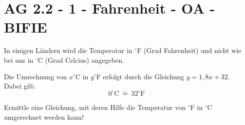 \section{AG 2.2 - 1 - Fahrenheit - OA - BIFIE}

\begin{beispiel}[AG 2.2]{1} %
		In einigen Ländern wird die Temperatur in $^\circ$F (Grad Fahrenheit) und nicht wie bei uns in $^\circ$C (Grad Celcius) angegeben. 

Die Umrechnung von $x^\circ$C in $y^\circ$F erfolgt durch die Gleichung $y=1,8x+32$. Dabei gilt:
\[0^\circ\text{C} ~\widehat{=}~	 32^\circ\text{F}\]

Ermittle eine Gleichung, mit deren Hilfe die Temperatur von $^\circ$F in $^\circ$C umgerechnet werden kann!

\end{beispiel}